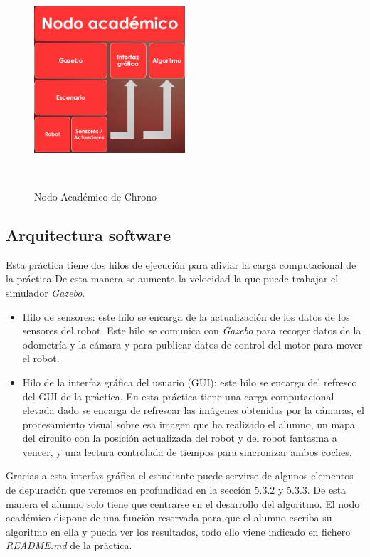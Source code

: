 \begin{figure}[H]
  \begin{center}
    \includegraphics[width=0.5\textwidth, height=8cm]{figures/na_ch.png}
		\caption{Nodo Académico de Chrono}
		\label{fig.na_ch}
		\end{center}
\end{figure} 

\subsection{Arquitectura software}
Esta práctica tiene dos hilos de ejecución para aliviar la carga computacional de la práctica De esta manera se aumenta la velocidad  la que puede trabajar el simulador \textit{Gazebo}.

\begin{itemize}
	\item Hilo de sensores: este hilo se encarga de la actualización de los datos de los sensores del robot. Este hilo se comunica con \textit{Gazebo} para recoger datos de la odometría y la cámara y para publicar datos de control del motor para mover el robot.
	\item Hilo de la interfaz gráfica del usuario (GUI): este hilo se encarga del refresco del GUI de la práctica. En esta práctica tiene una carga computacional elevada dado se encarga de refrescar las imágenes obtenidas por la cámaras, el procesamiento visual sobre esa imagen que ha realizado el alumno, un mapa del circuito con la posición actualizada del robot y del robot fantasma a vencer, y una lectura controlada de tiempos para sincronizar ambos coches.
\end{itemize}

Gracias a esta interfaz gráfica el estudiante puede servirse de algunos elementos de depuración que veremos en profundidad en la sección 5.3.2 y 5.3.3. De esta manera el alumno solo tiene que centrarse en el desarrollo del algoritmo. El nodo académico dispone de una función reservada para que el alumno escriba su algoritmo en ella y pueda ver los resultados, todo ello viene indicado en fichero \textit{README.md} de la práctica.


